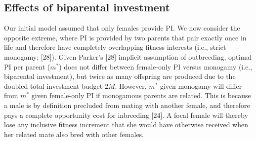 \documentclass[12pt]{article}
\begin{document}
\subsection*{Effects of biparental investment}

Our initial model assumed that only females provide PI. We now consider the opposite extreme, where PI is provided by two parents that pair exactly once in life and therefore have completely overlapping fitness interests (i.e., strict monogamy; [28]). Given Parker's [28] implicit assumption of outbreeding, optimal PI per parent ($m^{*}$) does not differ between female-only PI versus monogamy (i.e., biparental investment), but twice as many offspring are produced due to the doubled total investment budget $2M$. However, $m^{*}$ given monogamy will differ from $m^{*}$ given female-only PI if monogamous parents are related. This is because a male is by definition precluded from mating with another female, and therefore pays a complete opportunity cost for inbreeding [24]. A focal female will thereby lose any inclusive fitness increment that she would have otherwise received when her related mate also bred with other females.
\end{document}
